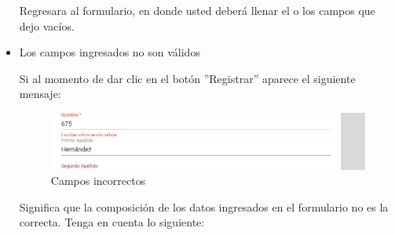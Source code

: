 \begin{itemize}
                         Regresara al formulario, en donde usted deberá llenar el o los campos que dejo vacíos. 
                    
                
                            
                        
                    
                    \newpage
                    \item Los campos ingresados no son válidos
                
                        Si al momento de dar clic en el botón ''Registrar'' aparece el siguiente mensaje:
                         \begin{figure}[!hbtp]
                            \centering
                            \includegraphics[width=0.4\linewidth]{images/SP1/MSG35}
                            \caption{Campos incorrectos}
                            \label{mensaje35}
                        
                        \end{figure}
                    
                        Significa que la composición de los datos ingresados en el formulario no es la correcta. Tenga en cuenta lo siguiente:
                    

\end{itemize}
